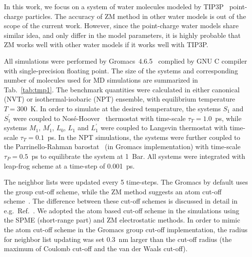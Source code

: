 \documentclass[a4paper,preprint,unsortedaddress,onecolumn,fleqn]{revtex4}
\newcommand{\recheck}[1]{{\color{red} #1}}
\begin{document}
\label{sec:protocols} In this work, we focus on a system of water molecules
modeled by TIP3P~\cite{jorgensen1983comparison} point-charge particles. 
The accuracy of ZM method in other water models is out of the scope of the
current work. However, since the point-charge water models share similar
idea, and only differ in the model parameters, it is highly probable that ZM
works well with other water models if it works well with TIP3P.

All simulations were performed by Gromacs~4.6.5~\cite{hess2008gromacs,
pronk2013gromacs} complied by GNU C compiler with single-precision floating
point. The size of the systems and corresponding number of molecules used
for MD simulations are summarized in Tab.~\ref{tab:tmp1}. The benchmark
quantities were calculated in either canonical (NVT) or isothermal-isobaric
(NPT) ensemble, with equilibrium temperature $T=300$~K. In order to simulate
at the desired temperature, the systems $S_{1}$ and $S_{1}^{\prime }$ were
coupled to Nos\'{e}-Hoover~\cite{nose1984molecular,hoover1985canonical}
thermostat with time-scale $\tau _{T}=1.0$~ps, while systems $M_{1}$, $%
M_{1}^{\prime }$, $L_{0}$, $L_{1}$ and $L_{1}^{\prime }$ were coupled to
Langevin thermostat with time-scale $\tau _{T}=0.1$~ps. In the NPT
simulations, the systems were further coupled to the Parrinello-Rahman
barostat~\cite{parrinello1980crystal,parrinello1981polymorphic} (in Gromacs
implementation) with time-scale $\tau _{P}=0.5$~ps to equilibrate the system
at 1~Bar. All systems were integrated with leap-frog scheme at a time-step
of 0.001~ps.

The neighbor lists were updated every 5 time-steps.
\recheck{The Gromacs by default uses the group cut-off scheme, while the ZM method suggests
  an atom cut-off scheme~\cite{fukuda2011molecular,fukuda2013zero}. The difference between
  these cut-off schemes is discussed in detail in e.g.~Ref.~\cite{hunenberger1998alternative,baumketner2009removing}.
  We adopted the atom based cut-off scheme in the simulations using the
  SPME (short-range part) and ZM electrostatic methods.
  In order to mimic the atom cut-off scheme in the Gromacs group cut-off implementation,
  the radius for neighbor list
  updating was set 0.3~nm larger than the cut-off radius (the maximum of
  Coulomb cut-off and the van der Waals cut-off). 
}

\end{document}
